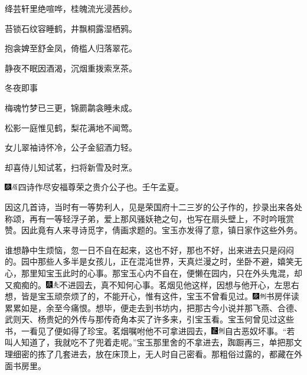 绛芸轩里绝喧哗，桂魄流光浸茜纱。

苔锁石纹容睡鹤，井飘桐露湿栖鸦。

抱衾婢至舒金凤，倚槛人归落翠花。

静夜不眠因酒渴，沉烟重拨索烹茶。

冬夜即事

梅魂竹梦已三更，锦罽鹴衾睡未成。

松影一庭惟见鹤，梨花满地不闻莺。

女儿翠袖诗怀冷，公子金貂酒力轻。

却喜侍儿知试茗，扫将新雪及时烹。

{\includegraphics[width=3mm]{../Images/00004}\includegraphics[width=3mm]{../Images/00010}\footnotesize \kaishu 四诗作尽安福尊荣之贵介公子也。壬午孟夏。}

因这几首诗，当时有一等势利人，见是荣国府十二三岁的公子作的，抄录出来各处称颂，再有一等轻浮子弟，爱上那风骚妖艳之句，也写在扇头壁上，不时吟哦赏赞。因此竟有人来寻诗觅字，倩画求题的。宝玉亦发得了意，镇日家作这些外务。

谁想静中生烦恼，忽一日不自在起来，这也不好，那也不好，出来进去只是闷闷的。园中那些人多半是女孩儿，正在混沌世界，天真烂漫之时，坐卧不避，嬉笑无心，那里知宝玉此时的心事。那宝玉心内不自在，便懒在园内，只在外头鬼混，却又痴痴的。{\includegraphics[width=3mm]{../Images/00004}\includegraphics[width=3mm]{../Images/00012}\footnotesize \kaishu 不进园去，真不知何心事。}茗烟见他这样，因想与他开心，左思右想，皆是宝玉顽奈烦了的，不能开心，惟有这件，宝玉不曾看见过。{\includegraphics[width=3mm]{../Images/00004}\includegraphics[width=3mm]{../Images/00011}\footnotesize \kaishu 书房伴读累累如是，余至今痛恨。}想毕，便走去到书坊内，把那古今小说并那飞燕、合德、武则天、杨贵妃的外传与那传奇角本买了许多来，引宝玉看。宝玉何曾见过这些书，一看见了便如得了珍宝。茗烟嘱咐他不可拿进园去，{\includegraphics[width=3mm]{../Images/00006}\includegraphics[width=3mm]{../Images/00011}\footnotesize \kaishu 自古恶奴坏事。}``若叫人知道了，我就吃不了兜着走呢。''宝玉那里舍的不拿进去，踟蹰再三，单把那文理细密的拣了几套进去，放在床顶上，无人时自己密看。那粗俗过露的，都藏在外面书房里。


